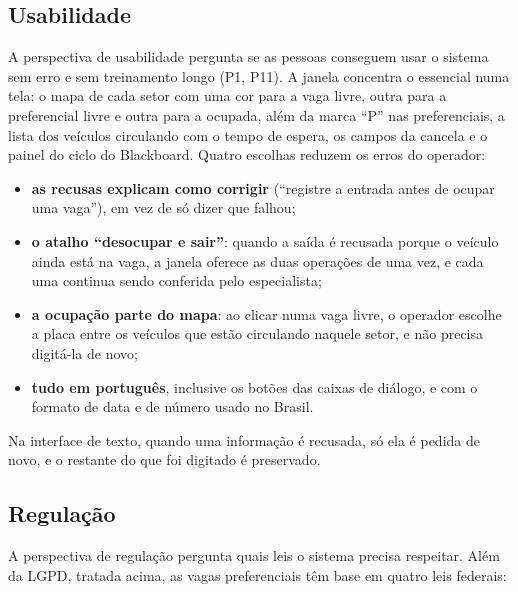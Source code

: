\subsection{Usabilidade}

A perspectiva de usabilidade pergunta se as pessoas conseguem usar o sistema sem erro e sem treinamento longo (P1, P11). A janela concentra o essencial numa tela: o mapa de cada setor com uma cor para a vaga livre, outra para a preferencial livre e outra para a ocupada, além da marca ``P'' nas preferenciais, a lista dos veículos circulando com o tempo de espera, os campos da cancela e o painel do ciclo do Blackboard. Quatro escolhas reduzem os erros do operador:

\begin{itemize}
  \item \textbf{as recusas explicam como corrigir} (``registre a entrada antes de ocupar uma vaga''), em vez de só dizer que falhou;
  \item \textbf{o atalho ``desocupar e sair''}: quando a saída é recusada porque o veículo ainda está na vaga, a janela oferece as duas operações de uma vez, e cada uma continua sendo conferida pelo especialista;
  \item \textbf{a ocupação parte do mapa}: ao clicar numa vaga livre, o operador escolhe a placa entre os veículos que estão circulando naquele setor, e não precisa digitá-la de novo;
  \item \textbf{tudo em português}, inclusive os botões das caixas de diálogo, e com o formato de data e de número usado no Brasil.
\end{itemize}

Na interface de texto, quando uma informação é recusada, só ela é pedida de novo, e o restante do que foi digitado é preservado.

\subsection{Regulação}

A perspectiva de regulação pergunta quais leis o sistema precisa respeitar. Além da LGPD, tratada acima, as vagas preferenciais têm base em quatro leis federais:

